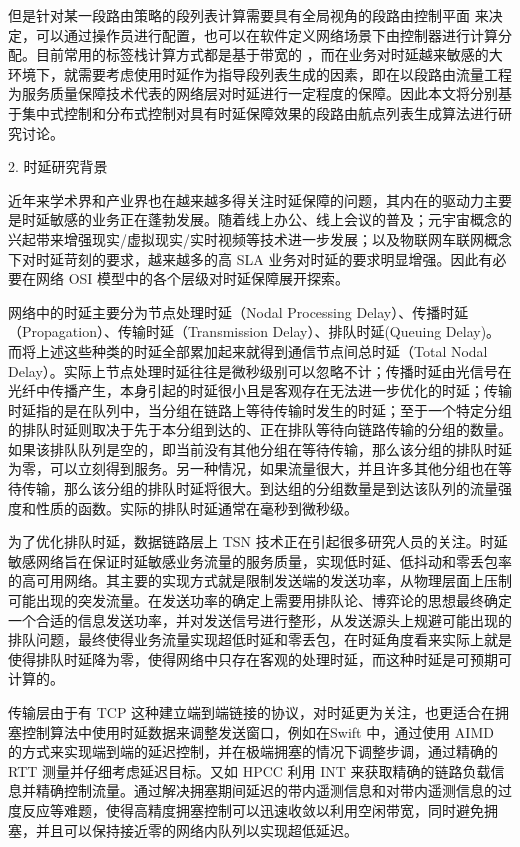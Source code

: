 但是针对某一段路由策略的段列表计算需要具有全局视角的段路由控制平面 \cite{SRARK} 来决定，可以通过操作员进行配置，也可以在软件定义网络场景下由控制器进行计算分配。目前常用的标签栈计算方式都是基于带宽的 \cite{SIDLENGTHPROVE, SIDLENGTHANALYSIS, SRQOE, SRMULTIPATH, SRLABELSTACK, SRNODETE, SRBANDWIDTH1, SRBANDWIDTH2, SRBANDWIDTH3, SRBANDWIDTH4, SRBANDWIDTH5, DEFO, SRBANDWIDTH6, SRBANDWIDTH7, SRBANDWIDTH8, SRBANDWIDTH9, SRBANDWIDTH11, SRBANDWIDTH12}，而在业务对时延越来敏感的大环境下，就需要考虑使用时延作为指导段列表生成的因素，即在以段路由流量工程为服务质量保障技术代表的网络层对时延进行一定程度的保障。因此本文将分别基于集中式控制和分布式控制对具有时延保障效果的段路由航点列表生成算法进行研究讨论。

2. 时延研究背景

近年来学术界和产业界也在越来越多得关注时延保障的问题，其内在的驱动力主要是时延敏感的业务正在蓬勃发展。随着线上办公、线上会议的普及；元宇宙概念的兴起带来增强现实/虚拟现实/实时视频等技术进一步发展；以及物联网车联网概念下对时延苛刻的要求，越来越多的高 \gls*{SLA} 业务对时延的要求明显增强。因此有必要在网络 \gls*{OSI} 模型中的各个层级对时延保障展开探索。

网络中的时延主要分为节点处理时延（Nodal Processing Delay）、传播时延（Propagation）、传输时延（Transmission Delay）、排队时延(Queuing Delay)。而将上述这些种类的时延全部累加起来就得到通信节点间总时延（Total Nodal Delay）。实际上节点处理时延往往是微秒级别可以忽略不计；传播时延由光信号在光纤中传播产生，本身引起的时延很小且是客观存在无法进一步优化的时延；传输时延指的是在队列中，当分组在链路上等待传输时发生的时延；至于一个特定分组的排队时延则取决于先于本分组到达的、正在排队等待向链路传输的分组的数量。如果该排队队列是空的，即当前没有其他分组在等待传输，那么该分组的排队时延为零，可以立刻得到服务。另一种情况，如果流量很大，并且许多其他分组也在等待传输，那么该分组的排队时延将很大。到达组的分组数量是到达该队列的流量强度和性质的函数。实际的排队时延通常在毫秒到微秒级。

为了优化排队时延，数据链路层上 \gls*{TSN} 技术正在引起很多研究人员的关注。时延敏感网络旨在保证时延敏感业务流量的服务质量，实现低时延、低抖动和零丢包率的高可用网络。其主要的实现方式就是限制发送端的发送功率，从物理层面上压制可能出现的突发流量。在发送功率的确定上需要用排队论、博弈论的思想最终确定一个合适的信息发送功率，并对发送信号进行整形，从发送源头上规避可能出现的排队问题，最终使得业务流量实现超低时延和零丢包，在时延角度看来实际上就是使得排队时延降为零，使得网络中只存在客观的处理时延，而这种时延是可预期可计算的。

传输层由于有 \gls*{TCP} 这种建立端到端链接的协议，对时延更为关注，也更适合在拥塞控制算法中使用时延数据来调整发送窗口，例如在Swift \cite{SWIFT} 中，通过使用 \gls*{AIMD} 的方式来实现端到端的延迟控制，并在极端拥塞的情况下调整步调，通过精确的 \gls*{RTT} 测量并仔细考虑延迟目标。又如 \gls*{HPCC} \cite{HPCC} 利用 \gls*{INT} 来获取精确的链路负载信息并精确控制流量。通过解决拥塞期间延迟的带内遥测信息和对带内遥测信息的过度反应等难题，使得高精度拥塞控制可以迅速收敛以利用空闲带宽，同时避免拥塞，并且可以保持接近零的网络内队列以实现超低延迟。

